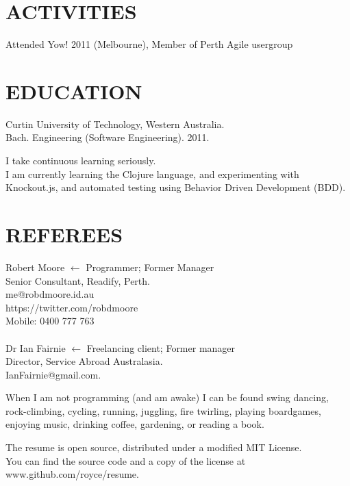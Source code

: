 \documentclass[margin]{res}
\begin{document}
\begin{resume}

  \section{ACTIVITIES}
  Attended Yow! 2011 (Melbourne),
  Member of Perth Agile usergroup

  \section{EDUCATION}
  Curtin University of Technology, Western Australia. \\
  Bach. Engineering (Software Engineering). 2011.
  
  I take continuous learning seriously.\\
  I am currently learning the Clojure language, and experimenting with Knockout.js, and automated testing using
  Behavior Driven Development (BDD).

  \section{REFEREES}
  Robert Moore
  \hfill $\longleftarrow$ Programmer; Former Manager\\
  Senior Consultant, Readify, Perth. \\
  me@robdmoore.id.au \\
  https://twitter.com/robdmoore \\
  Mobile: 0400 777 763 \\
  \\
  Dr Ian Fairnie
  \hfill $\longleftarrow$ Freelancing client; Former manager\\
  Director, Service Abroad Australasia. \\
  IanFairnie@gmail.com. \\

\end{resume} 

\vfill
\centering

\hspace{-1.75in}  When I am not programming (and am awake) I can be found swing dancing, \\
\hspace{-1.75in}  rock-climbing, cycling, running, juggling, fire twirling, playing boardgames, \\
\hspace{-1.75in}  enjoying music, drinking coffee, gardening, or reading a book.

\vfill
\hspace{-1.75in}  The resume is open source, distributed under a modified MIT License. \\
\hspace{-1.75in}  You can find the source code and a copy of the license at www.github.com/royce/resume.
\end{document}
